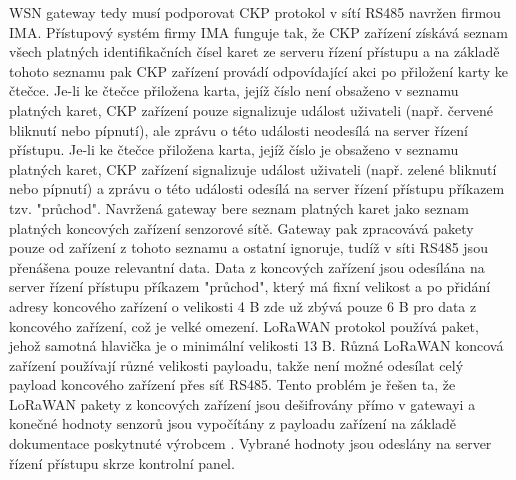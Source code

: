 WSN gateway tedy musí podporovat CKP protokol v sítí RS485 navržen firmou IMA.
Přístupový systém firmy IMA funguje tak, že CKP zařízení získává seznam všech platných identifikačních čísel karet ze serveru řízení přístupu a na základě tohoto seznamu pak CKP zařízení provádí odpovídající akci po přiložení karty ke čtečce. 
Je-li ke čtečce přiložena karta, jejíž číslo není obsaženo v seznamu platných karet, CKP zařízení pouze signalizuje událost uživateli (např. červené bliknutí nebo pípnutí), ale zprávu o této události neodesílá na server řízení přístupu. Je-li ke čtečce přiložena karta, jejíž číslo je obsaženo v seznamu platných karet, CKP zařízení signalizuje událost uživateli (např. zelené bliknutí nebo pípnutí) a zprávu o této události odesílá na server řízení přístupu příkazem tzv. "průchod".
Navržená gateway bere seznam platných karet jako seznam platných koncových zařízení senzorové sítě. Gateway pak zpracovává pakety pouze od zařízení z tohoto seznamu a ostatní ignoruje, tudíž v síti RS485 jsou přenášena pouze relevantní data.
Data z koncových zařízení jsou odesílána na server řízení přístupu příkazem "průchod", který má fixní velikost a po přidání adresy koncového zařízení o velikosti 4 B zde už zbývá pouze 6 B pro data z koncového zařízení, což je velké omezení.
LoRaWAN protokol používá paket, jehož samotná hlavička je o minimální velikosti 13 B. 
Různá LoRaWAN koncová zařízení používají různé velikosti payloadu, takže není možné odesílat celý payload koncového zařízení přes síť RS485.
Tento problém je řešen ta, že LoRaWAN pakety z koncových zařízení jsou dešifrovány přímo v gatewayi a konečné hodnoty senzorů jsou vypočítány z payloadu zařízení na základě dokumentace poskytnuté výrobcem \cite{RHF1S001 pdf}. Vybrané hodnoty jsou odeslány na server řízení přístupu skrze kontrolní panel. 


